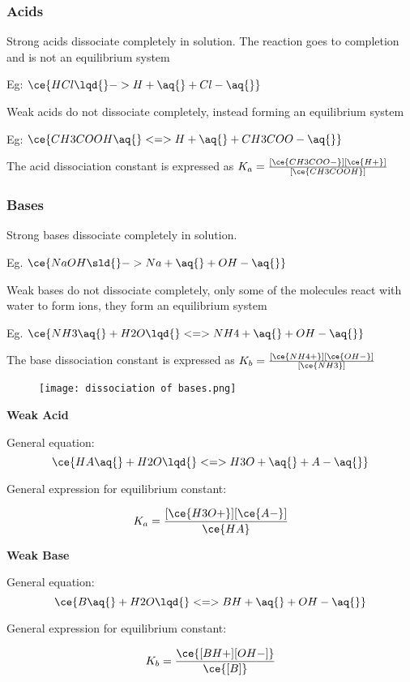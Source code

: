 		\subsubsection{Acids}
			Strong acids dissociate completely in solution. The reaction goes to completion and is not an equilibrium system

			\subitem Eg: $\ce{HCl \lqd{} -> H+ \aq{} + Cl- \aq{}}$

			Weak acids do not dissociate completely, instead forming an equilibrium system

			\subitem Eg: $\ce{CH3COOH \aq{} <=> H+ \aq{} + CH3COO- \aq{}}$

			The acid dissociation constant is expressed as $K_a = \frac{[\ce{CH3COO-}][\ce{H+}]}{[\ce{CH3COOH}]}$

		\subsubsection{Bases}
			Strong bases dissociate completely in solution.

			\subitem Eg. $\ce{NaOH \sld{} -> Na+ \aq{} + OH- \aq{}}$

			Weak bases do not dissociate completely, only some of the molecules react with water to form ions, they form an equilibrium system

			\subitem Eg. $\ce{NH3 \aq{} + H2O \lqd{} <=> NH4+ \aq{} + OH- \aq{}}$
			
			The base dissociation constant is expressed as $K_b = \frac{[\ce{NH4+}][\ce{OH-}]}{[\ce{NH3}]}$

			\begin{figure}[H]
				\centering
				\texttt{[image: dissociation of bases.png]}
			\end{figure}

		\begin{multicols}{2}
			\textbf{Weak Acid}

			General equation:
			$$\ce{HA \aq{} + H2O \lqd{} <=> H3O+ \aq{} + A- \aq{}}$$

			General expression for equilibrium constant:

			$$K_a = \frac{[\ce{H3O+}][\ce{A-}]}{\ce{HA}}$$
			
			\columnbreak

			\textbf{Weak Base}

			General equation:
			$$\ce{B \aq{} + H2O \lqd{} <=> BH+ \aq{} + OH- \aq{}}$$

			General expression for equilibrium constant:

			$$K_b = \frac{\ce{[BH+][OH-]}}{\ce{[B]}}$$
		\end{multicols}

